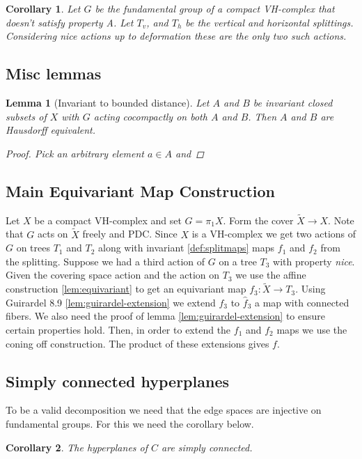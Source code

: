\documentclass{article}
\theoremstyle{mystyle}
\newtheorem{lem}{Lemma}[section]
\newtheorem*{cor*}{Corollary}
\theoremstyle{remark}
\begin{document}
    \begin{cor*}
        Let \(G\) be the fundamental group of a compact VH-complex that doesn't satisfy {\em property A}. Let \(T_{v}\), and \(T_{h}\) be the vertical and horizontal splittings. Considering {\em nice} actions up to deformation these are the only two such actions. 
    \end{cor*}

\subsection{Misc lemmas}

\begin{lem}
    [Invariant to bounded distance]
    Let \(A\) and \(B\) be invariant closed subsets of \(X\) with \(G\) acting cocompactly on both \(A\) and \(B\). Then \(A\) and \(B\) are Hausdorff equivalent. 
    \begin{proof}
        Pick an arbitrary element \(a \in A\) and  
    \end{proof}
\end{lem}


\subsection{Main Equivariant Map Construction}
Let \(X\) be a compact VH-complex and set \(G= \pi_{1} X\). Form the cover \(\widetilde{X} \to X\). Note that \(G\) acts on \(\widetilde X\) freely and PDC. Since \(X\) is a VH-complex we get two actions of \(G\) on trees \(T_{1}\) and \(T_{2}\) along with invariant \ref{def:splitmaps} maps \(f_{1}\) and \(f_{2}\) from the splitting. Suppose we had a third action of \(G\) on a tree \(T_{3}\) with property {\em nice}. Given the covering space action and the action on \(T_{3}\) we use the affine construction \ref{lem:equivariant} to get an equivariant map \(f_{3} : \widetilde X \to T_{3}\). Using Guirardel 8.9 \ref{lem:guirardel-extension} we extend \(f_{3}\) to \(\widehat f_{3}\) a map with connected fibers. We also need the proof of lemma \ref{lem:guirardel-extension} to ensure certain properties hold. Then, in order to extend the \(f_{1}\) and \(f_{2}\) maps we use the coning off construction. The product of these extensions gives \(f\).
    
    \subsection{Simply connected hyperplanes}
    To be a valid decomposition we need that the edge spaces are injective on fundamental groups. For this we need the corollary below.
\begin{cor*}
    The hyperplanes of \(C\) are simply connected. 
\end{cor*}
\end{document}

